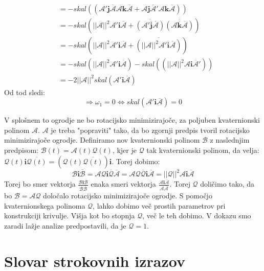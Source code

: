 \documentclass[mat1]{fmfdelo}
\newcommand{\ii}{\boldsymbol i}
\newcommand{\jj}{\boldsymbol j}
\newcommand{\kk}{\boldsymbol k}
\newcommand{\A}{\mathcal A}
\newcommand{\B}{\mathcal B}
\newcommand{\QQ}{\mathcal Q}
\begin{document}
\begin{dokaz}
\begin{equation*}
\begin{split}
	&= -skal \left( \left( \A' \jj \overline{\A} \A \kk \overline{\A}+ \A \jj \overline{\A}' \A \kk \overline{\A}  \right) \right) \\
	&= -skal \left( ||\A||^2 \A' \ii \overline{\A}+ \overline{\left(\A' \overline{\jj} \overline{\A}\right)} \overline{ \left( \A \overline{\kk} \overline{\A} \right) }\right) \\
	&= -skal \left( ||\A||^2 \A' \ii \overline{\A}+ \overline{\left( ||\A||^2 \A' \overline{\ii} \overline{\A}\right)} \right) \\
	&= -skal \left( ||\A||^2 \A' \ii \overline{\A} \right)-skal \left(\left( ||\A||^2 \A \ii \overline{\A}'\right) \right) \\
	&= -2||\A||^2 skal \left( \A' \ii \overline{\A}\right)
\end{split}
\end{equation*}
Od tod sledi:
\begin{equation*}
\Longrightarrow \omega_1 = 0 \Leftrightarrow skal \left( \A' \ii \overline{\A} \right) = 0
\end{equation*}
\end{dokaz}
\begin{opomba}
V splošnem to ogrodje ne bo rotacijsko minimizirajoče, za poljuben kvaternionski polinom $\A$. $\A$ je treba "popraviti" tako, da bo zgornji predpis tvoril rotacijsko minimizirajoče ogrodje. Definiramo nov kvaternionski polinom $\B$ z naslednjim predpisom: $\B(t) = \A(t) \QQ(t)$, kjer je $\QQ$ tak kvaternionski polinom, da velja: $\QQ(t) \ii \overline{\QQ(t)} = \left( \QQ(t) \overline{\QQ(t)} \right) \ii$. Torej dobimo:
\begin{equation*}
	\B \ii \overline{\B} = \A \QQ \ii \overline{\QQ} \overline{\A} = \A \QQ \overline{\QQ} \ii \overline{\A} = ||\QQ||^2\A\ii\overline{\A}
\end{equation*}
Torej bo smer vektorja $\frac{\B \ii \overline{\B}}{\B  \overline{\B}}$ enaka smeri vektorja $\frac{\A \ii \overline{\A}}{\A  \overline{\A}}$. Torej $\QQ$ doličimo tako, da bo $\B = \A\QQ$ določalo rotacijsko minimizirajoče ogrodje. S pomočjo kvaternionskega polinoma $\QQ$, lahko dobimo več prostih parametrov pri konstrukciji krivulje. Višja kot bo stopnja $\QQ$, več le teh dobimo. V dokazu smo zaradi lažje analize predpostavili, da je $\QQ=1$.
\end{opomba}



\section*{Slovar strokovnih izrazov}

\geslo{}{}
\geslo{}{}

\begin{thebibliography}{99}


\end{thebibliography}
\end{document}
